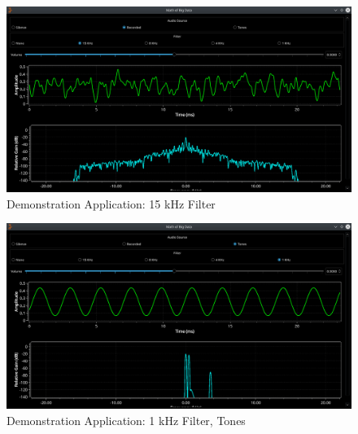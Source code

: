 \begin{figure}
	\centering
	\includegraphics[width=\linewidth]{images/application.png} 
	\caption{Demonstration Application: 15 kHz Filter}
	\label{fig:fifteen}
\end{figure}    

\begin{figure}
	\centering
	\includegraphics[width=\linewidth]{images/application2.png}
	\caption{Demonstration Application: 1 kHz Filter, Tones}
	\label{fig:tones}
\end{figure}    
